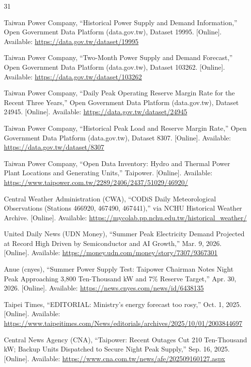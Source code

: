 \documentclass[conference]{IEEEtran}
\begin{document}
\begin{thebibliography}{31}

Taiwan Power Company, ``Historical Power Supply and Demand Information,'' Open Government Data Platform (data.gov.tw), Dataset 19995. [Online]. Available: \url{https://data.gov.tw/dataset/19995}

Taiwan Power Company, ``Two-Month Power Supply and Demand Forecast,'' Open Government Data Platform (data.gov.tw), Dataset 103262. [Online]. Available: \url{https://data.gov.tw/dataset/103262}

Taiwan Power Company, ``Daily Peak Operating Reserve Margin Rate for the Recent Three Years,'' Open Government Data Platform (data.gov.tw), Dataset 24945. [Online]. Available: \url{https://data.gov.tw/dataset/24945}

Taiwan Power Company, ``Historical Peak Load and Reserve Margin Rate,'' Open Government Data Platform (data.gov.tw), Dataset 8307. [Online]. Available: \url{https://data.gov.tw/dataset/8307}

Taiwan Power Company, ``Open Data Inventory: Hydro and Thermal Power Plant Locations and Generating Units,'' Taipower. [Online]. Available: \url{https://www.taipower.com.tw/2289/2406/2437/51029/46920/}

Central Weather Administration (CWA), ``CODiS Daily Meteorological Observations (Stations 466920, 467490, 467441),'' via NCHU Historical Weather Archive. [Online]. Available: \url{https://mycolab.pp.nchu.edu.tw/historical_weather/}

United Daily News (UDN Money), ``Summer Peak Electricity Demand Projected at Record High Driven by Semiconductor and AI Growth,'' Mar. 9, 2026. [Online]. Available: \url{https://money.udn.com/money/story/7307/9367301}

Anue (cnyes), ``Summer Power Supply Test: Taipower Chairman Notes Night Peak Approaching 3,800 Ten-Thousand kW and 7\% Reserve Target,'' Apr. 30, 2026. [Online]. Available: \url{https://news.cnyes.com/news/id/6438135}

Taipei Times, ``EDITORIAL: Ministry's energy forecast too rosy,'' Oct. 1, 2025. [Online]. Available: \url{https://www.taipeitimes.com/News/editorials/archives/2025/10/01/2003844697}

Central News Agency (CNA), ``Taipower: Recent Outages Cut 210 Ten-Thousand kW; Backup Units Dispatched to Secure Night Peak Supply,'' Sep. 16, 2025. [Online]. Available: \url{https://www.cna.com.tw/news/afe/202509160127.aspx}


\end{thebibliography}
\end{document}
